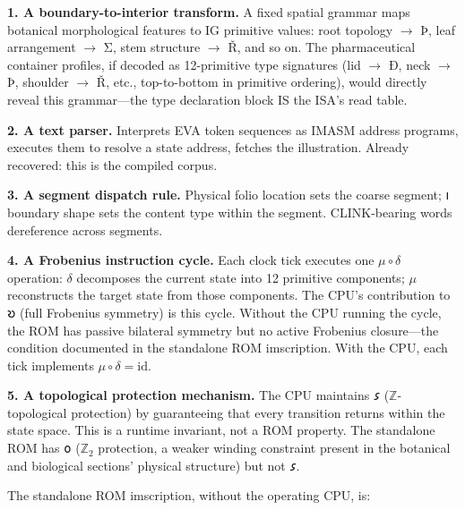 \documentclass[12pt,a4paper]{article}
\begin{document}
\textbf{1. A boundary-to-interior transform.} A fixed spatial grammar maps botanical morphological features to IG primitive values: root topology $\to$ $\text{Þ}$, leaf arrangement $\to$ $\text{Σ}$, stem structure $\to$ $\text{Ř}$, and so on. The pharmaceutical container profiles, if decoded as 12-primitive type signatures (lid $\to$ $\text{Ð}$, neck $\to$ $\text{Þ}$, shoulder $\to$ $\text{Ř}$, etc., top-to-bottom in primitive ordering), would directly reveal this grammar---the type declaration block IS the ISA's read table.

\textbf{2. A text parser.} Interprets EVA token sequences as IMASM address programs, executes them to resolve a state address, fetches the illustration. Already recovered: this is the compiled corpus.

\textbf{3. A segment dispatch rule.} Physical folio location sets the coarse segment; $𐑦$ boundary shape sets the content type within the segment. CLINK-bearing words dereference across segments.

\textbf{4. A Frobenius instruction cycle.} Each clock tick executes one $\mu \circ \delta$ operation: $\delta$ decomposes the current state into 12 primitive components; $\mu$ reconstructs the target state from those components. The CPU's contribution to $𐑹$ (full Frobenius symmetry) is this cycle. Without the CPU running the cycle, the ROM has passive bilateral symmetry but no active Frobenius closure---the condition documented in the standalone ROM imscription. With the CPU, each tick implements $\mu \circ \delta = \mathrm{id}$.

\textbf{5. A topological protection mechanism.} The CPU maintains $𐑭$ ($\mathbb{Z}$-topological protection) by guaranteeing that every transition returns within the state space. This is a runtime invariant, not a ROM property. The standalone ROM has $𐑴$ ($\mathbb{Z}_2$ protection, a weaker winding constraint present in the botanical and biological sections' physical structure) but not $𐑭$.

The standalone ROM imscription, without the operating CPU, is:
\end{document}
